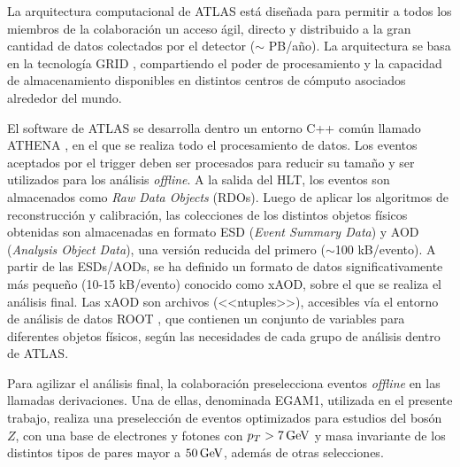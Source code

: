 La arquitectura computacional de ATLAS está diseñada para permitir a todos los miembros de la colaboración un acceso ágil, directo y distribuido a la gran cantidad de datos colectados por el detector ($\sim$ PB/año). La arquitectura se basa en la tecnología GRID , compartiendo el poder de procesamiento y la capacidad de almacenamiento disponibles en distintos centros de cómputo asociados alrededor del mundo.

El software de ATLAS se desarrolla dentro un entorno C++ común llamado ATHENA \cite{ATLASComputing, Lenzi:1214931, Calafiura:865624}, en el que se realiza todo el procesamiento de datos. Los eventos aceptados por el trigger deben ser procesados para reducir su tamaño y ser utilizados para los análisis \textit{offline}. A la salida del HLT, los eventos son almacenados como \textit{Raw Data Objects} (RDOs). Luego de aplicar los algoritmos de reconstrucción y calibración, las colecciones de los distintos objetos físicos obtenidas son almacenadas en formato ESD (\textit{Event Summary Data}) y AOD (\textit{Analysis Object Data}), una versión reducida del primero ($\sim$100 kB/evento). A partir de las ESDs/AODs, se ha definido un formato de datos significativamente más pequeño (10-15 kB/evento) conocido como xAOD, sobre el que se realiza el análisis final. Las xAOD son archivos (<<ntuples>>), accesibles vía el entorno de análisis de datos ROOT \cite{Brun:1997pa}, que contienen un conjunto de variables para diferentes objetos físicos, según las necesidades de cada grupo de análisis dentro de ATLAS. 

Para agilizar el análisis final, la colaboración preselecciona eventos \textit{offline} en las llamadas derivaciones. Una de ellas, denominada EGAM1, utilizada en el presente trabajo, realiza una preselección de eventos optimizados para estudios del bosón $Z$, con una base de electrones y fotones con $p_{T} > 7 \, \mathrm{GeV}$ y masa invariante de los distintos tipos de pares mayor a $50 \, \mathrm{GeV}$, además de otras selecciones.
